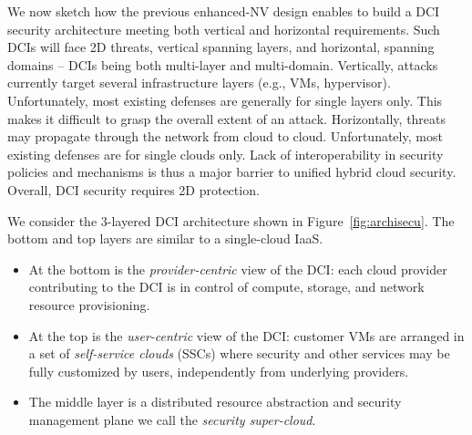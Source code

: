 \documentclass{sig-alternate}
\begin{document}
\noindent We now sketch how the previous enhanced-NV design enables to build a DCI security architecture meeting both vertical and horizontal requirements. Such DCIs will face 2D threats, vertical spanning layers, and horizontal, spanning domains -- DCIs being both multi-layer and multi-domain. Vertically, attacks currently target several infrastructure layers (e.g., VMs, hypervisor). Unfortunately, most existing defenses are generally for single layers only. This makes it difficult to grasp the overall extent of an attack. Horizontally, threats may propagate through the network from cloud to cloud. Unfortunately, most existing defenses are for single clouds only. Lack of interoperability in security policies and mechanisms is thus a major barrier to  unified hybrid cloud security. Overall, DCI security requires 2D protection.

We consider the 3-layered DCI architecture shown in Figure~\ref{fig:archisecu}. The bottom and top layers are similar to a single-cloud IaaS.
\begin{itemize}
\item
At the bottom is the \textit{provider-centric} view of the DCI: each cloud provider contributing to the DCI is in control of compute, storage, and network resource provisioning.  
\item At the top is the \textit{user-centric} view of the DCI: customer VMs are arranged in a set of \textit{self-service clouds} (SSCs) where security and other services may be fully customized by users, independently from underlying providers.
\item The middle layer is a distributed resource abstraction and security management plane we call the \textit{security super-cloud}.
\end{itemize}
\end{document}
